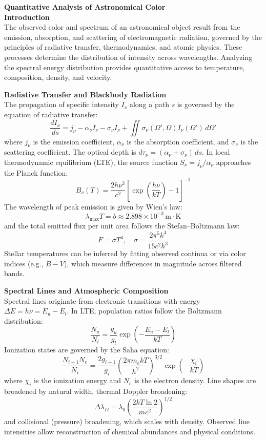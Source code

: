 \begin{technical}
{\Large\textbf{Quantitative Analysis of Astronomical Color}}\\[0.7em]

\noindent\textbf{Introduction}\\[0.5em]
The observed color and spectrum of an astronomical object result from the emission, absorption, and scattering of electromagnetic radiation, governed by the principles of radiative transfer, thermodynamics, and atomic physics. These processes determine the distribution of intensity across wavelengths. Analyzing the spectral energy distribution provides quantitative access to temperature, composition, density, and velocity.

\noindent\textbf{Radiative Transfer and Blackbody Radiation}\\[0.5em]
The propagation of specific intensity \( I_\nu \) along a path \( s \) is governed by the equation of radiative transfer:
\[
\frac{dI_\nu}{ds} = j_\nu - \alpha_\nu I_\nu - \sigma_\nu I_\nu + \iint \sigma_\nu(\Omega', \Omega) I_\nu(\Omega')\, d\Omega'
\]
where \( j_\nu \) is the emission coefficient, \( \alpha_\nu \) is the absorption coefficient, and \( \sigma_\nu \) is the scattering coefficient. The optical depth is \( d\tau_\nu = (\alpha_\nu + \sigma_\nu)\, ds \). In local thermodynamic equilibrium (LTE), the source function \( S_\nu = j_\nu/\alpha_\nu \) approaches the Planck function:
\[
B_\nu(T) = \frac{2h\nu^3}{c^2} \left[ \exp\left( \frac{h\nu}{kT} \right) - 1 \right]^{-1}
\]
The wavelength of peak emission is given by Wien’s law:
\[
\lambda_{\text{max}} T = b \approx 2.898 \times 10^{-3} \, \text{m} \cdot \text{K}
\]
and the total emitted flux per unit area follows the Stefan–Boltzmann law:
\[
F = \sigma T^4, \quad \sigma = \frac{2\pi^5 k^4}{15c^2 h^3}
\]
Stellar temperatures can be inferred by fitting observed continua or via color indices (e.g., \( B-V \)), which measure differences in magnitude across filtered bands.

\noindent\textbf{Spectral Lines and Atmospheric Composition}\\[0.5em]
Spectral lines originate from electronic transitions with energy \( \Delta E = h\nu = E_u - E_l \). In LTE, population ratios follow the Boltzmann distribution:
\[
\frac{N_u}{N_l} = \frac{g_u}{g_l} \exp\left( -\frac{E_u - E_l}{kT} \right)
\]
Ionization states are governed by the Saha equation:
\[
\frac{N_{i+1} N_e}{N_i} = \frac{2 g_{i+1}}{g_i} \left( \frac{2\pi m_e kT}{h^2} \right)^{3/2} \exp\left( -\frac{\chi_i}{kT} \right)
\]
where \( \chi_i \) is the ionization energy and \( N_e \) is the electron density. Line shapes are broadened by natural width, thermal Doppler broadening:
\[
\Delta \lambda_D = \lambda_0 \left( \frac{2kT \ln 2}{mc^2} \right)^{1/2}
\]
and collisional (pressure) broadening, which scales with density. Observed line intensities allow reconstruction of chemical abundances and physical conditions.


\end{technical}
